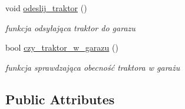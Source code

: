 \begin{DoxyCompactItemize}
void \mbox{\hyperlink{class_c_pole_abfd3ba6eda25112d187886928a390e18}{odeslij\+\_\+traktor}} ()
\begin{DoxyCompactList}\small\item\em funkcja odsyłająca traktor do garazu \end{DoxyCompactList}\item 
bool \mbox{\hyperlink{class_c_pole_afe55a2c80adfa160d1cbda99300b34a3}{czy\+\_\+traktor\+\_\+w\+\_\+garazu}} ()
\begin{DoxyCompactList}\small\item\em funkcja sprawdzająca obecność traktora w garażu \end{DoxyCompactList}\end{DoxyCompactItemize}
\subsection*{Public Attributes}
